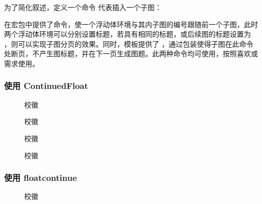 为了简化叙述，定义一个命令 \clist{\subfigg} 代表插入一个子图：
\begin{texcodeonly}[]{}
  \newcommand{\subfigg}{
    \begin{subfigure}[b]{0.49\linewidth}
      \centering
      \texttt{[image: xjtu\_blue.pdf]}
      \subcaption{蓝色校徽}
    \end{subfigure}
  }
\end{texcodeonly}

在宏包中提供了\clist{\ContinuedFloat}命令，使一个浮动体环境与其内子图的编号跟随前一个子图，此时两个浮动体环境可以分别设置标题，若具有相同的标题，或后续图的标题设置为 ，则可以实现子图分页的效果。同时，模板提供了 \clist{\floatcontinue} ，通过包装\clist{\ContinuedFloat}使得子图在此命令处断页，不产生图标题，并在下一页生成图题。此两种命令均可使用，按照喜欢或需求使用。
\clearpage
\subsubsection{使用 ContinuedFloat}

\begin{texcodeonly}[]{}
  \begin{figure}[h]
    \subfigg    \subfigg
    \caption{校徽}
  \end{figure}
  
  \begin{figure}[h]
    \ContinuedFloat
    \subfigg    \subfigg
    \subfigg    \subfigg
    \caption{校徽} %
  \end{figure}
\end{texcodeonly}

\begin{figure}[h]
  \subfigg    \subfigg
  \caption{校徽}
\end{figure}

\begin{figure}[H]
  \ContinuedFloat
  \subfigg    \subfigg
  \subfigg    \subfigg
  \caption{校徽} %
\end{figure}

\subsubsection{使用 floatcontinue}

\begin{texcodeonly}[]{}
  \begin{figure}[H]
    \subfigg    \subfigg
    \subfigg    \subfigg
    \subfigg    \subfigg
    \caption{校徽}
  \end{figure}
\end{texcodeonly}

